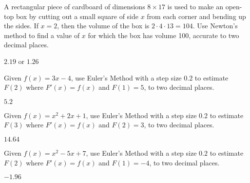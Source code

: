 \begin{exercises}
\begin{exercise} A rectangular piece of cardboard of dimensions $8\times 17$
is used to make an open-top box by cutting out a small square of side
$x$ from each corner and bending up the sides.  If $x=2$, then the
volume of the box is $2\cdot 4\cdot 13=104$.  Use Newton's method to
find a value of $x$ for which the box has volume 100, accurate to two
decimal places.
\begin{answer} $2.19$ or $1.26$
\end{answer}
\end{exercise}

\begin{exercise}
Given $f(x) = 3x-4$, use Euler's Method with a step size $0.2$ to
estimate $F(2)$ where $F'(x) = f(x)$ and $F(1)=5$, to two decimal
places.
\begin{answer} $5.2$
\end{answer}
\end{exercise}


\begin{exercise}
Given $f(x) = x^2+2x+1$, use Euler's Method with a step size $0.2$ to
estimate $F(3)$ where $F'(x) = f(x)$ and $F(2)=3$, to two decimal
places.
\begin{answer} $14.64$
\end{answer}
\end{exercise}

\begin{exercise}
Given $f(x) = x^2-5x+7$, use Euler's Method with a step size $0.2$ to
estimate $F(2)$ where $F'(x) = f(x)$ and $F(1)=-4$, to two decimal
places.
\begin{answer} $-1.96$
\end{answer}
\end{exercise}




\end{exercises}
